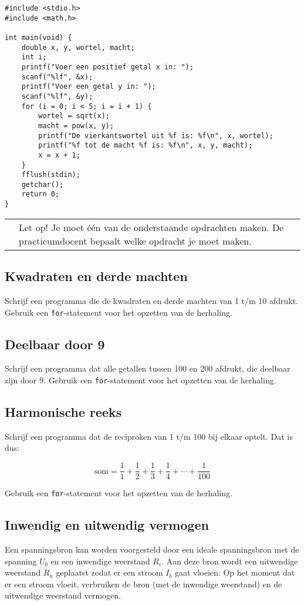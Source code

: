 \documentclass[a4paper,10pt,fleqn,twoside]{article}
\newcommand{\letop}{%
\vspace*{2ex}
\begin{mdframed}[outerlinewidth = 1 ,%
roundcorner = 4 pt,%
leftmargin = 40,%
rightmargin = 40,%
backgroundcolor = yellow!40,%
outerlinecolor = red!70!black,%
innertopmargin = \topskip,%
splittopskip = \topskip,%
]
\begin{tabularx}{\linewidth}{m{1cm}X}
\Large\leftpointright & Let op! Je moet één van de onderstaande opdrachten maken. De practicumdocent bepaalt welke opdracht je moet maken.
\end{tabularx}
\end{mdframed}
}
\begin{document}
\begin{lstlisting}
#include <stdio.h>
#include <math.h>

int main(void) {
    double x, y, wortel, macht;
    int i;
    printf("Voer een positief getal x in: ");
    scanf("%lf", &x);
    printf("Voer een getal y in: ");
    scanf("%lf", &y);
    for (i = 0; i < 5; i = i + 1) {
        wortel = sqrt(x);
        macht = pow(x, y);
        printf("De vierkantswortel uit %f is: %f\n", x, wortel);
        printf("%f tot de macht %f is: %f\n", x, y, macht);
        x = x + 1;
    }
    fflush(stdin);
    getchar();
    return 0;
}
\end{lstlisting}

\letop

\subsection{Kwadraten en derde machten}
Schrijf een programma die de kwadraten en derde machten van 1 t/m 10 afdrukt. Gebruik een \lstinline|for|-statement voor het opzetten van de herhaling.

\subsection{Deelbaar door 9}
Schrijf een programma dat alle getallen tussen 100 en 200 afdrukt, die deelbaar zijn door 9. Gebruik een \lstinline|for|-statement voor het opzetten van de herhaling.

\subsection{Harmonische reeks}
Schrijf een programma dat de reciproken van 1 t/m 100 bij elkaar optelt. Dat is dus:

\begin{equation*}
\text{som} = \dfrac{1}{1}+\dfrac{1}{2}+\dfrac{1}{3}+\dfrac{1}{4} + \cdots + \dfrac{1}{100}
\end{equation*}

Gebruik een \lstinline|for|-statement voor het opzetten van de herhaling.
 
\subsection{Inwendig en uitwendig vermogen}
Een spanningsbron kan worden voorgesteld door een ideale spanningsbron met de spanning $U_b$ en een inwendige weerstand $R_i$. Aan deze bron wordt een uitwendige weerstand $R_u$ geplaatst zodat er een stroom $I_b$ gaat vloeien. Op het moment dat er een stroom vloeit, verbruiken de bron (met de inwendige weerstand) en de uitwendige weerstand vermogen.
\end{document}
